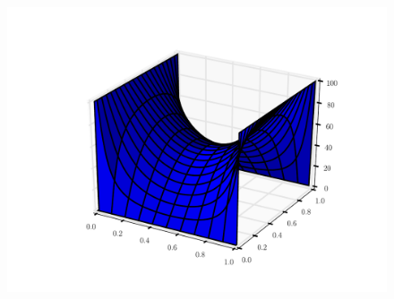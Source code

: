 \begin{problem}
\begin{figure}[H] \includegraphics[width=.75\textwidth]{laplace.pdf}
\end{figure} \end{problem}


